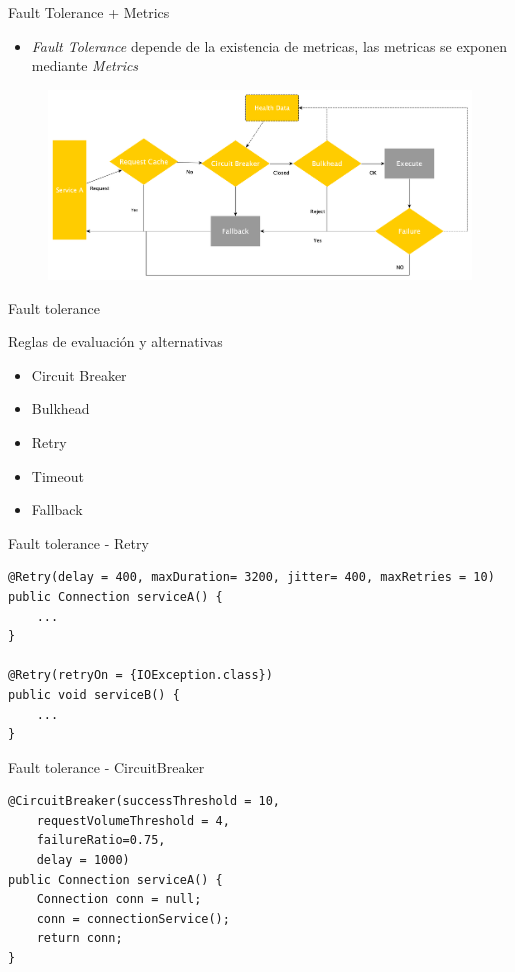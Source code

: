 \documentclass[aspectratio=169]{beamer}
\begin{document}
\begin{frame}{Fault Tolerance + Metrics}

\begin{itemize}
	\item \textit{Fault Tolerance} depende de la existencia de metricas, las metricas se exponen  mediante \textit{Metrics}
\end{itemize}

\begin{figure}
	\centering
	\includegraphics[width=0.9\linewidth]{Images/falldata}
\end{figure}

\end{frame}


\begin{frame}{Fault tolerance}

Reglas de evaluación y alternativas
\begin{itemize}
\item Circuit Breaker
\item Bulkhead
\item Retry
\item Timeout
\item Fallback
\end{itemize}

\end{frame}

\begin{frame}[fragile]{Fault tolerance - Retry}
\begin{lstlisting}
@Retry(delay = 400, maxDuration= 3200, jitter= 400, maxRetries = 10)
public Connection serviceA() {
    ...
}

@Retry(retryOn = {IOException.class})
public void serviceB() {
    ...
}
\end{lstlisting}
\end{frame}

\begin{frame}[fragile]{Fault tolerance - CircuitBreaker}
\begin{lstlisting}
@CircuitBreaker(successThreshold = 10,
    requestVolumeThreshold = 4,
    failureRatio=0.75,
    delay = 1000)
public Connection serviceA() {
    Connection conn = null;
    conn = connectionService();
    return conn;
}
\end{lstlisting}
\end{frame}
\end{document}
